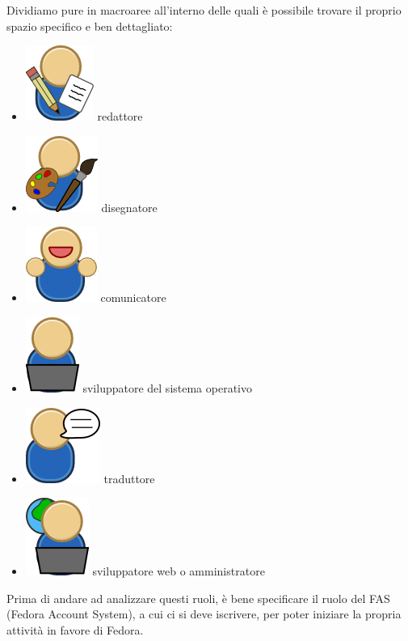 Dividiamo pure in macroaree all'interno delle quali è possibile trovare il proprio spazio specifico e ben dettagliato:
\begin{itemize}
\item \includegraphics[scale=.20]{articoli/varie/immagini/join-writer.png} redattore 
\item \includegraphics[scale=.20]{articoli/varie/immagini/join-designer.png} disegnatore
\item \includegraphics[scale=.20]{articoli/varie/immagini/join-people.png} comunicatore
\item \includegraphics[scale=.20]{articoli/varie/immagini/join-osdevel.png} sviluppatore del sistema operativo
\item \includegraphics[scale=.20]{articoli/varie/immagini/join-translator.png} traduttore
\item \includegraphics[scale=.20]{articoli/varie/immagini/join-webdevel.png} sviluppatore web o amministratore
\end{itemize}
Prima di andare ad analizzare questi ruoli, è bene specificare il ruolo del FAS (Fedora Account System), a cui ci si deve iscrivere, per poter iniziare la propria attività in favore di Fedora.\\

